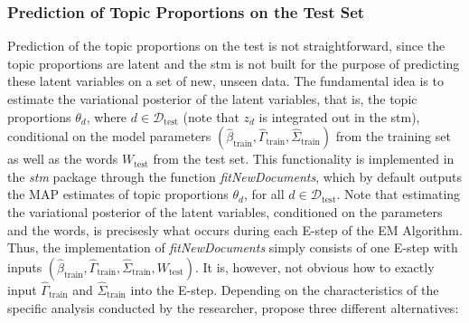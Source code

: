 \subsubsection{Prediction of Topic Proportions on the Test Set}

Prediction of the topic proportions on the test is not straightforward, since the topic proportions are latent and the stm is not built for the purpose of predicting these latent variables on a set of new, unseen data. The fundamental idea is to estimate the variational posterior of the latent variables, that is, the topic proportions $\theta_d$, where $d \in \mathcal{D}_{\text{test}}$ (note that $z_d$ is integrated out in the stm), conditional on the model parameters $(\hat{\beta}_{\text{train}}, \hat{\Gamma}_{\text{train}}, \hat{\Sigma}_{\text{train}})$ from the training set as well as the words $W_{\text{test}}$ from the test set. This functionality is implemented in the \textit{stm} package through the function \textit{fitNewDocuments}, which by default outputs the MAP estimates of topic proportions $\theta_d$, for all $d \in \mathcal{D}_{\text{test}}$. Note that estimating the variational posterior of the latent variables, conditioned on the parameters and the words, is precisesly what occurs during each E-step of the EM Algorithm. Thus, the implementation of \textit{fitNewDocuments} simply consists of one E-step with inputs $(\hat{\beta}_{\text{train}}, \hat{\Gamma}_{\text{train}}, \hat{\Sigma}_{\text{train}}, W_{\text{test}})$. It is, however, not obvious how to exactly input $\hat{\Gamma}_{\text{train}}$ and  $\hat{\Sigma}_{\text{train}}$ into the E-step. Depending on the characteristics of the specific analysis conducted by the researcher, \cite{egami2018make} propose three different alternatives:
